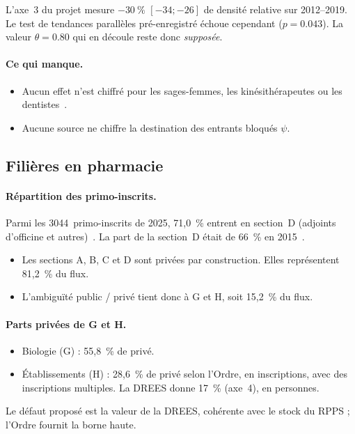 \documentclass[11pt]{article}
\begin{document}
L'axe~3 du projet mesure $-30~\%$\mesure{} $[-34 ; -26]$ de densité
relative sur 2012--2019. Le test de tendances parallèles pré-enregistré
échoue cependant ($p = \num{0.043}$\mesure{}). La valeur $\theta = \num{0.80}$
qui en découle reste donc \emph{supposée}\suppose{}.

\paragraph{Ce qui manque.}
\begin{itemize}
\item Aucun effet n'est chiffré pour les sages-femmes, les kinésithérapeutes
  ou les dentistes~\cite{igas2023,ccomptes2024}.
\item Aucune source ne chiffre la destination des entrants bloqués $\psi$.
\end{itemize}

\subsection{Filières en pharmacie}

\paragraph{Répartition des primo-inscrits.}
Parmi les \num{3044}~primo-inscrits de 2025, 71,0~\% entrent en section~D
(adjoints d'officine et autres)~\cite{cnop2025}. La part de la section~D
était de 66~\% en 2015~\cite{cnop2016}.
\begin{itemize}
\item Les sections A, B, C et D sont privées par construction. Elles
  représentent 81,2~\%\derive{} du flux.
\item L'ambiguïté public / privé tient donc à G et H, soit 15,2~\%\derive{}
  du flux.
\end{itemize}

\paragraph{Parts privées de G et H.}
\begin{itemize}
\item Biologie (G) : 55,8~\%\derive{} de privé.
\item Établissements (H) : 28,6~\%\derive{} de privé selon l'Ordre, en
  inscriptions, avec des inscriptions multiples. La DREES donne 17~\%
  (axe~4), en personnes.
\end{itemize}
Le défaut proposé est la valeur de la DREES, cohérente avec le stock du
RPPS ; l'Ordre fournit la borne haute.
\end{document}
